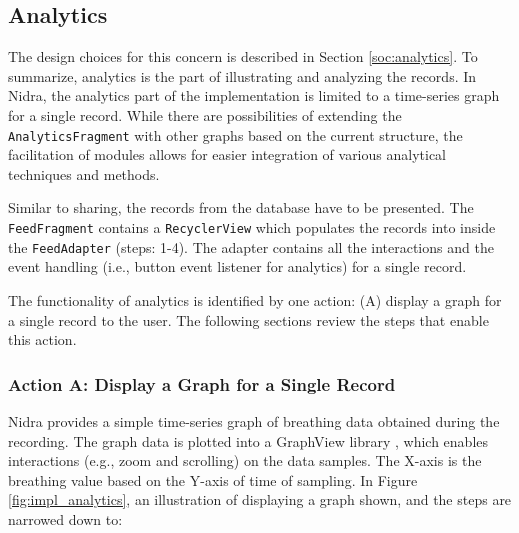 \subsection{Analytics}\label{ioc:analytics}
The design choices for this concern is described in Section \ref{soc:analytics}. To summarize, analytics is the part of illustrating and analyzing the records. In Nidra, the analytics part of the implementation is limited to a time-series graph for a single record. While there are possibilities of extending the \verb|AnalyticsFragment| with other graphs based on the current structure, the facilitation of modules allows for easier integration of various analytical techniques and methods.

Similar to sharing, the records from the database have to be presented. The \verb|FeedFragment| contains a \verb|RecyclerView| which populates the records into inside the \verb|FeedAdapter| (steps: 1-4). The adapter contains all the interactions and the event handling (i.e., button event listener for analytics) for a single record. 

The functionality of analytics is identified by one action: (A) display a graph for a single record to the user. The following sections review the steps that enable this action. 

\subsubsection{Action A: Display a Graph for a Single Record}
Nidra provides a simple time-series graph of breathing data obtained during the recording. The graph data is plotted into a GraphView library \cite{androidgraph}, which enables interactions (e.g., zoom and scrolling) on the data samples. The X-axis is the breathing value based on the Y-axis of time of sampling. In Figure \ref{fig:impl_analytics}, an illustration of displaying a graph shown, and the steps are narrowed down to:

